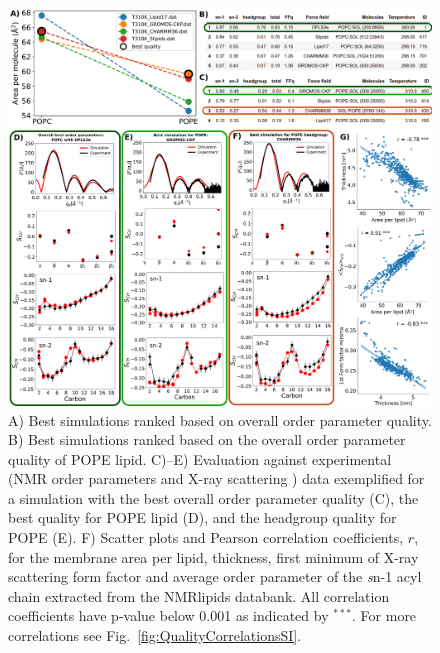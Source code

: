 \documentclass[fleqn,10pt]{wlscirep}
\begin{document}
\begin{figure}[!t]
    \centering
    \includegraphics[width=\linewidth]{Figures/quality5.pdf}
    \caption{ A) Best simulations ranked based on overall order parameter quality.
    B) Best simulations ranked based on the overall order parameter quality of POPE lipid. 
    C)--E) Evaluation against experimental (NMR order parameters and X-ray scattering ) data exemplified for a simulation with the best overall order parameter quality (C), the best quality for POPE lipid (D), and the headgroup quality for POPE (E).
    F) Scatter plots and Pearson correlation coefficients, $r$, for the membrane area per lipid, thickness, first minimum of X-ray scattering form factor and average order parameter of the {\textit sn}-1 acyl chain extracted from the NMRlipids databank. All correlation coefficients have p-value below 0.001 as indicated by $^{***}$. For more correlations see Fig.~\ref{fig:QualityCorrelationsSI}.
    }
    \label{fig:quality}
\end{figure}


\end{document}
